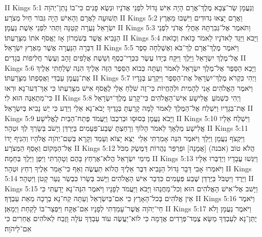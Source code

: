 II Kings 5:1	וְנַעֲמָן שַׂר־צְבָא מֶלֶךְ־אֲרָם הָיָה אִישׁ גָּדוֹל לִפְנֵי אֲדֹנָיו וּנְשֻׂא פָנִים כִּי־בוֹ נָתַן־יְהֹוָה תְּשׁוּעָה לַאֲרָם וְהָאִישׁ הָיָה גִּבּוֹר חַיִל מְצֹרָע׃
II Kings 5:2	וַאֲרָם יָצְאוּ גְדוּדִים וַיִּשְׁבּוּ מֵאֶרֶץ יִשְׂרָאֵל נַעֲרָה קְטַנָּה וַתְּהִי לִפְנֵי אֵשֶׁת נַעֲמָן׃
II Kings 5:3	וַתֹּאמֶר אֶל־גְּבִרְתָּהּ אַחֲלֵי אֲדֹנִי לִפְנֵי הַנָּבִיא אֲשֶׁר בְּשֹׁמְרוֹן אָז יֶאֱסֹף אֹתוֹ מִצָּרַעְתּוֹ׃
II Kings 5:4	וַיָּבֹא וַיַּגֵּד לַאדֹנָיו לֵאמֹר כָּזֹאת וְכָזֹאת דִּבְּרָה הַנַּעֲרָה אֲשֶׁר מֵאֶרֶץ יִשְׂרָאֵל׃
II Kings 5:5	וַיֹּאמֶר מֶלֶךְ־אֲרָם לֶךְ־בֹּא וְאֶשְׁלְחָה סֵפֶר אֶל־מֶלֶךְ יִשְׂרָאֵל וַיֵּלֶךְ וַיִּקַּח בְּיָדוֹ עֶשֶׂר כִּכְּרֵי־כֶסֶף וְשֵׁשֶׁת אֲלָפִים זָהָב וְעֶשֶׂר חֲלִיפוֹת בְּגָדִים׃
II Kings 5:6	וַיָּבֵא הַסֵּפֶר אֶל־מֶלֶךְ יִשְׂרָאֵל לֵאמֹר וְעַתָּה כְּבוֹא הַסֵּפֶר הַזֶּה אֵלֶיךָ הִנֵּה שָׁלַחְתִּי אֵלֶיךָ אֶת־נַעֲמָן עַבְדִּי וַאֲסַפְתּוֹ מִצָּרַעְתּוֹ׃
II Kings 5:7	וַיְהִי כִּקְרֹא מֶלֶךְ־יִשְׂרָאֵל אֶת־הַסֵּפֶר וַיִּקְרַע בְּגָדָיו וַיֹּאמֶר הַאֱלֹהִים אָנִי לְהָמִית וּלְהַחֲיוֹת כִּי־זֶה שֹׁלֵחַ אֵלַי לֶאֱסֹף אִישׁ מִצָּרַעְתּוֹ כִּי אַךְ־דְּעוּ־נָא וּרְאוּ כִּי־מִתְאַנֶּה הוּא לִי׃
II Kings 5:8	וַיְהִי כִּשְׁמֹעַ  אֱלִישָׁע אִישׁ־הָאֱלֹהִים כִּי־קָרַע מֶלֶךְ־יִשְׂרָאֵל אֶת־בְּגָדָיו וַיִּשְׁלַח אֶל־הַמֶּלֶךְ לֵאמֹר לָמָּה קָרַעְתָּ בְּגָדֶיךָ יָבֹא־נָא אֵלַי וְיֵדַע כִּי יֵשׁ נָבִיא בְּיִשְׂרָאֵל׃
II Kings 5:9	וַיָּבֹא נַעֲמָן בְּסוּסָו וּבְרִכְבּוֹ וַיַּעֲמֹד פֶּתַח־הַבַּיִת לֶאֱלִישָׁע׃
II Kings 5:10	וַיִּשְׁלַח אֵלָיו אֱלִישָׁע מַלְאָךְ לֵאמֹר הָלוֹךְ וְרָחַצְתָּ שֶׁבַע־פְּעָמִים בַּיַּרְדֵּן וְיָשֹׁב בְּשָׂרְךָ לְךָ וּטְהָר׃
II Kings 5:11	וַיִּקְצֹף נַעֲמָן וַיֵּלַךְ וַיֹּאמֶר הִנֵּה אָמַרְתִּי אֵלַי  יֵצֵא יָצוֹא וְעָמַד וְקָרָא בְּשֵׁם־יְהֹוָה אֱלֹהָיו וְהֵנִיף יָדוֹ אֶל־הַמָּקוֹם וְאָסַף הַמְּצֹרָע׃
II Kings 5:12	הֲלֹא טוֹב (אבנה) [אֲמָנָה] וּפַרְפַּר נַהֲרוֹת דַּמֶּשֶׂק מִכֹּל מֵימֵי יִשְׂרָאֵל הֲלֹא־אֶרְחַץ בָּהֶם וְטָהָרְתִּי וַיִּפֶן וַיֵּלֶךְ בְּחֵמָה׃
II Kings 5:13	וַיִּגְּשׁוּ עֲבָדָיו וַיְדַבְּרוּ אֵלָיו וַיֹּאמְרוּ אָבִי דָּבָר גָּדוֹל הַנָּבִיא דִּבֶּר אֵלֶיךָ הֲלוֹא תַעֲשֶׂה וְאַף כִּי־אָמַר אֵלֶיךָ רְחַץ וּטְהָר׃
II Kings 5:14	וַיֵּרֶד וַיִּטְבֹּל בַּיַּרְדֵּן שֶׁבַע פְּעָמִים כִּדְבַר אִישׁ הָאֱלֹהִים וַיָּשׁב בְּשָׂרוֹ כִּבְשַׂר נַעַר קָטֹן וַיִּטְהָר׃
II Kings 5:15	וַיָּשׁב אֶל־אִישׁ הָאֱלֹהִים הוּא וְכל־מַחֲנֵהוּ וַיָּבֹא וַיַּעֲמֹד לְפָנָיו וַיֹּאמֶר הִנֵּה־נָא יָדַעְתִּי כִּי אֵין אֱלֹהִים בְּכל־הָאָרֶץ כִּי אִם־בְּיִשְׂרָאֵל וְעַתָּה קַח־נָא בְרָכָה מֵאֵת עַבְדֶּךָ׃
II Kings 5:16	וַיֹּאמֶר חַי־יְהֹוָה אֲשֶׁר־עָמַדְתִּי לְפָנָיו אִם־אֶקָּח וַיִּפְצַר־בּוֹ לָקַחַת וַיְמָאֵן׃
II Kings 5:17	וַיֹּאמֶר נַעֲמָן וָלֹא יֻתַּן־נָא לְעַבְדְּךָ מַשָּׂא צֶמֶד־פְּרָדִים אֲדָמָה כִּי לוֹא־יַעֲשֶׂה עוֹד עַבְדְּךָ עֹלָה וָזֶבַח לֵאלֹהִים אֲחֵרִים כִּי אִם־לַיהֹוָה׃
